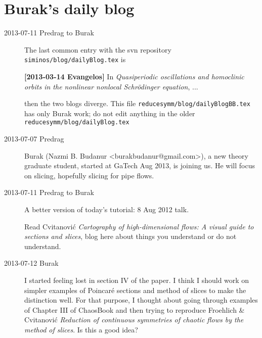 
\chapter{Burak's daily blog}
\label{c-dailyBlogBB}

\renewcommand{\LieEl}{\ensuremath{g}}  %
\renewcommand{\gSpace}{\ensuremath{\theta}}   %
\renewcommand{\ssp}{x}
\renewcommand{\sspRed}{\ensuremath{\hat{x}}}  %
\renewcommand{\vel}{\ensuremath{v}}   %

\begin{description}
\item[2013-07-11  Predrag to Burak] The last common entry with the svn repository \texttt{siminos/blog/dailyBlog.tex} is

{\bf [2013-03-14 Evangelos]} In
\emph{Quasiperiodic oscillations and homoclinic orbits in the nonlinear nonlocal
Schr\"odinger equation}, ...

then the two blogs diverge. This file
\texttt{reducesymm/blog/dailyBlogBB.tex}
has only Burak work; do not edit anything in
the older \texttt{reducesymm/blog/dailyBlog.tex}

\item[2013-07-07  Predrag]
Burak (Nazmi B. Budanur <burakbudanur@gmail.com>), a new theory graduate student, started at GaTech Aug 2013, is joining us. He will focus on slicing, hopefully
slicing for pipe flows.

\item[2013-07-11  Predrag to Burak]
A better version of today's tutorial:
 {8 Aug 2012 talk}.

Read  {Cvitanovi\'c \etal} \emph{Cartography of high-dimensional flows: A visual guide to sections and slices}, blog here about things you understand or do not understand.

\item[2013-07-12  Burak] I started feeling lost in section IV of the
    paper. I think I should work on simpler examples of Poincar\'e
    sections and method of slices to make the distinction well. For
    that purpose, I thought about going through examples of Chapter III
    of ChaosBook and then trying to reproduce
    {Froehlich \& Cvitanovi\'c} \emph{Reduction of continuous
    symmetries of chaotic flows by the method of slices}. Is
    this a good idea?


\end{description}
